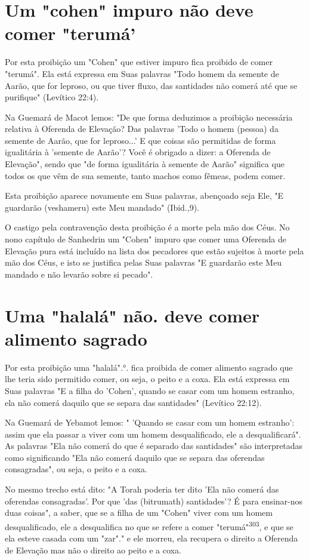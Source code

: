 \begin{itemize}
\begin{enumrate}
\begin{itemize}
\begin{itemize}
\begin{itemize}
\section{Um "cohen" impuro não deve comer "terumá'}

Por esta proibição um "Cohen" que estiver impuro fica proibido de comer
"terumá". Ela está expressa em Suas palavras "Todo homem da semen­te de
Aarão, que for leproso, ou que tiver fluxo, das santidades não comerá
até que se purifique" (Levítico 22:4).

Na Guemará de Macot lemos: "De que forma deduzimos a proibição
necessária relativa à Oferenda de Elevação? Das palavras 'Todo o homem
(pes­soa) da semente de Aarão, que for leproso...' E que coisas são
permitidas de forma igualitária à 'semente de Aarão'? Você é obrigado a
dizer: a Oferenda de Elevação", sendo que "de forma igualitária à
semente de Aarão" significa que todos os que vêm de sua semente, tanto
machos como fêmeas, podem comer.

Esta proibição aparece novamente em Suas palavras, abençoado se­ja Ele,
"E guardarão (veshameru) este Meu mandado" (Ibid.,9).

O castigo pela contravenção desta proibição é a morte pela mão dos Céus.
No nono capítulo de Sanhedrin um "Cohen" impuro que comer uma Ofe­renda
de Elevação pura está incluído na lista dos pecadores que estão sujeitos
à morte pela mão dos Céus, e isto se justifica pelas Suas palavras "E
guardarão este Meu mandado e não levarão sobre si pecado".

\section{Uma "halalá" não. deve comer alimento sagrado}

Por esta proibição uma "halalá".°.
fica proibida de comer alimento sagrado que lhe teria sido permitido
comer, ou seja, o peito e a coxa. Ela está expressa em Suas palavras "E
a filha do 'Cohen', quando se casar com um ho­mem estranho, ela não
comerá daquilo que se separa das santidades" (Levítico 22:12).

Na Guemará de Yebamot lemos: " 'Quando se casar com um homem estranho':
assim que ela passar a viver com um homem desqualificado, ele a
desqualificará". As palavras "Ela não comerá do que é separado das
santida­des" são interpretadas como significando "Ela não comerá daquilo
que se se­para das oferendas consagradas", ou seja, o peito e a coxa.

No mesmo trecho está dito: "A Torah poderia ter dito 'Ela não co­merá
das oferendas consagradas'. Por que 'das (bitrumath) santidades'? É para
ensinar-nos duas coisas", a saber, que se a filha de um "Cohen" viver
com um homem desqualificado, ele a desqualifica no que se refere a comer
"teru­má"\textsuperscript{303}, e que se ela esteve casada com um
"zar"." e ele morreu, ela recupera o direito a
Oferenda de Elevação mas não o direito ao peito e a coxa.



\end{itemize}
\end{itemize}
\end{itemize}
\end{enumrate}
\end{itemize}
